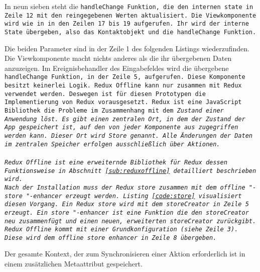 In neun sieben steht die \tt{handleChange} Funktion, die den internen \tt{state} in Zeile 12 mit den reingegebenen Werten aktualisiert.
Die Viewkomponente wird wie in in den Zeilen 17 bis 19 aufgerufen. Ihr wird der interne State übergeben, also das Kontaktobjekt und die \tt{handleChange} Funktion. 
\begin{center}
  
\end{center}
%
Die beiden Parameter sind in der Zeile 1 des folgenden Listings wiederzufinden.
Die Viewkomponente macht nichts anderes als die ihr übergebenen Daten anzuzeigen. Im Ereignisbehandler des Eingabefeldes wird die übergebene \tt{handleChange} Funktion, in der Zeile 5, aufgerufen.
Diese Komponente besitzt keinerlei Logik.
%
%
Redux Offline kann nur zusammen mit Redux verwendet werden. Deswegen ist für diesen Prototypen die Implementierung von Redux vorausgesetzt.
Redux ist eine JavaScript Bibliothek die Probleme im Zusammenhang mit dem \it{Zustand} einer Anwendung löst.
Es gibt einen zentralen Ort, in dem der \it{Zustand} der App gespeichert ist, auf den von jeder Komponente aus zugegriffen werden kann.
Dieser Ort wird Store genannt. Alle Änderungen der Daten im zentralen Speicher erfolgen ausschließlich über Aktionen.\\\\
%
Redux Offline ist eine erweiternde Bibliothek für Redux dessen Funktionsweise in Abschnitt \ref{sub:reduxoffline} detailliert beschrieben wird.\\
Nach der Installation muss der Redux \tt{store} zusammen mit dem \tt{offline "-store "-enhancer} erzeugt werden. Listing \ref{code:store} visualisiert diesen Vorgang. Ein Redux \tt{store} wird mit dem \tt{storeCreator} in Zeile 5 erzeugt. Ein \tt{store "-enhancer} ist eine Funktion die den \tt{storeCreator} neu zusammenfügt und einen neuen, erweiterten \tt{storeCreator} zurückgibt.
Redux Offline kommt mit einer Grundkonfiguration (siehe Zeile 3). Diese wird dem \tt{offline store enhancer} in Zeile 8 übergeben.
\begin{center}
  
\end{center}
Der gesamte Kontext, der zum Synchronisieren einer Aktion erforderlich ist in einem zusätzlichen Metaattribut gespeichert.
